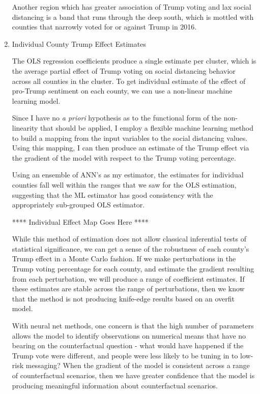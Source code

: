 \documentclass{article}
\begin{document}
\begin{enumerate}
	Another region which has greater association of Trump voting and lax social distancing is a band that runs through the deep south, which is mottled with counties that narrowly voted for or against Trump in 2016.
	
	
	\item Individual County Trump Effect Estimates
	
	The OLS regression coefficients produce a single estimate per cluster, which is the average partial effect of Trump voting on social distancing behavior across all counties in the cluster. To get individual estimate of the effect of pro-Trump sentiment on each county, we can use a non-linear machine learning model.
	
	Since I have no \textit{a priori} hypothesis as to the functional form of the non-linearity that should be applied, I employ a flexible machine learning method to build a mapping from the input variables to the social distancing values. Using this mapping, I can then produce an estimate of the Trump effect via the gradient of the model with respect to the Trump voting percentage.
	
	Using an ensemble of ANN's as my estimator, the estimates for individual counties fall well within the ranges that we saw for the OLS estimation, suggesting that the ML estimator has good consistency with the appropriately sub-grouped OLS estimator.
	
	**** Individual Effect Map Goes Here ****

	While this method of estimation does not allow classical inferential tests of statistical significance, we can get a sense of the robustness of each county's Trump effect in a Monte Carlo fashion. If we make perturbations in the Trump voting percentage for each county, and estimate the gradient resulting from each perturbation, we will produce a range of coefficient estimates. If these estimates are stable across the range of perturbations, then we know that the method is not producing knife-edge results based on an overfit model. 
	
	With neural net methods, one concern is that the high number of parameters allows the model to identify observations on numerical means that have no bearing on the counterfactual question - what would have happened if the Trump vote were different, and people were less likely to be tuning in to low-risk messaging? When the gradient of the model is consistent across a range of counterfactual scenarios, then we have greater confidence that the model is producing meaningful information about counterfactual scenarios. 
	

\end{enumerate}
\end{document}
